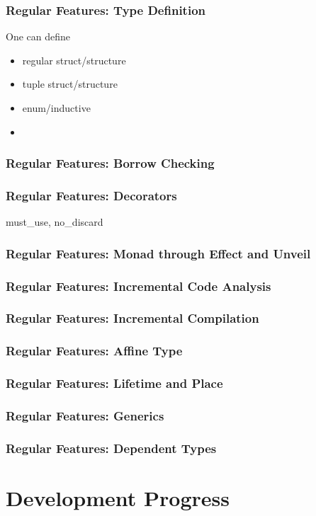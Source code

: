 \documentclass{beamer}   	%
\theoremstyle{definition}
\begin{document}
\begin{frame}
\frametitle{Regular Features: Type Definition}

One can define
\begin{itemize}
	\item regular struct/structure
	\item tuple struct/structure
	\item enum/inductive
	\item 
\end{itemize}
\end{frame}

\begin{frame}
\frametitle{Regular Features: Borrow Checking}
\end{frame}

\begin{frame}
\frametitle{Regular Features: Decorators}
must\_use, no\_discard

\end{frame}

\begin{frame}
\frametitle{Regular Features: Monad through Effect and Unveil}
\end{frame}

\begin{frame}
\frametitle{Regular Features: Incremental Code Analysis}
\end{frame}

\begin{frame}
\frametitle{Regular Features: Incremental Compilation}
\end{frame}

\begin{frame}
\frametitle{Regular Features: Affine Type}
\end{frame}

\begin{frame}
\frametitle{Regular Features: Lifetime and Place}
\end{frame}

\begin{frame}
\frametitle{Regular Features: Generics}
\end{frame}

\begin{frame}
\frametitle{Regular Features: Dependent Types}
\end{frame}

\section{Development Progress}
\end{document}
